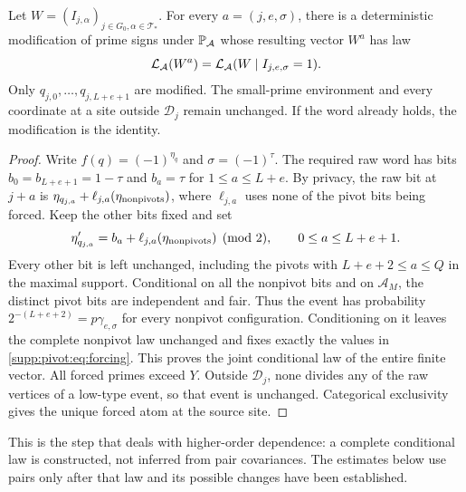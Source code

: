\begin{proposition}\label{supp:pivot:prop:forcing}\label{C-PALM-FORCING}
Let $W=(I_{j,\alpha})_{j\in G_0,\alpha\in\mathcal T_*}$.
For every $a=(j,e,\sigma)$, there is a deterministic modification of prime signs under $\mathbb P_{\mathcal A}$ whose resulting vector $W^a$ has law
\[
 \mathcal L_{\mathcal A}(W^a)=\mathcal L_{\mathcal A}(W\mid I_{j,e,\sigma}=1).
\]
Only $q_{j,0},\ldots,q_{j,L+e+1}$ are modified. The small-prime environment and every coordinate at a site outside $\mathscr D_j$ remain unchanged. If the word already holds, the modification is the identity.
\end{proposition}
\begin{proof}
Write $f(q)=(-1)^{\eta_q}$ and $\sigma=(-1)^\tau$.
The required raw word has bits
$b_0=b_{L+e+1}=1-\tau$ and $b_a=\tau$ for $1\le a\le L+e$.
By privacy, the raw bit at $j+a$ is
$\eta_{q_{j,a}}+\ell_{j,a}(\eta_{\rm nonpivots})$, where $\ell_{j,a}$ uses none of the pivot bits being forced. Keep the other bits fixed and set
\begin{equation}\label{supp:pivot:eq:forcing}
 \eta'_{q_{j,a}}=b_a+\ell_{j,a}(\eta_{\rm nonpivots})\pmod2,
 \qquad 0\le a\le L+e+1.
\end{equation}
Every other bit is left unchanged, including the pivots with
$L+e+2\le a\le Q$ in the maximal support. Conditional on all the
nonpivot bits and on $\mathcal A_M$, the distinct pivot bits are
independent and fair. Thus the event has probability
$2^{-(L+e+2)}=p\gamma_{e,\sigma}$ for every nonpivot configuration. Conditioning on it leaves the complete nonpivot law unchanged and fixes exactly the values in \eqref{supp:pivot:eq:forcing}. This proves the joint conditional law of the entire finite vector.
All forced primes exceed $Y$. Outside $\mathscr D_j$, none divides any of the raw vertices of a low-type event, so that event is unchanged. Categorical exclusivity gives the unique forced atom at the source site.
\end{proof}

This is the step that deals with higher-order dependence: a complete conditional law is constructed, not inferred from pair covariances. The estimates below use pairs only after that law and its possible changes have been established.

